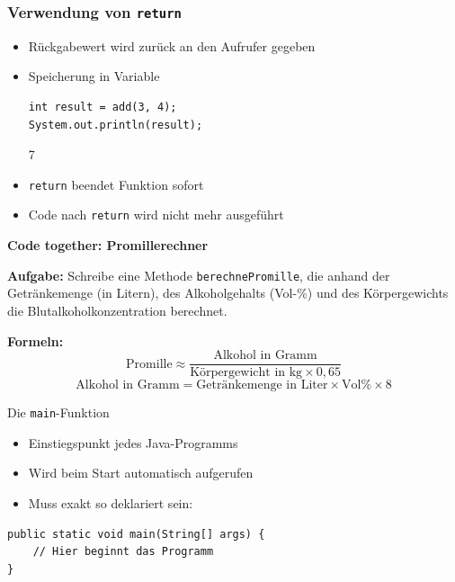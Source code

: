 \documentclass{../../presentation}
\begin{document}
\begin{frame}[fragile]
	\frametitle{Verwendung von \texttt{return}}

	\begin{itemize}
		\item\pause Rückgabewert wird zurück an den Aufrufer gegeben
		\item\pause Speicherung in Variable
		      \begin{verbatim}
int result = add(3, 4);
System.out.println(result); 
		\end{verbatim}
		      \begin{ausgabe}
			      7
		      \end{ausgabe}
		\item\pause \texttt{return} beendet Funktion sofort
		\item\pause Code nach \texttt{return} wird nicht mehr ausgeführt
	\end{itemize}
\end{frame}


\begin{frame}[plain]
    \centering
    {\Huge\bfseries Code together: Promillerechner}

    \vspace{1em}

    \begin{flushleft}
        \textbf{Aufgabe:} Schreibe eine Methode \texttt{berechnePromille}, die anhand der Getränkemenge (in Litern), 
        des Alkoholgehalts (Vol-\%) und des Körpergewichts die Blutalkoholkonzentration berechnet. 

        \vspace{1em}

        \textbf{Formeln:} 
        \[
            \text{Promille} \approx \frac{\text{Alkohol in Gramm}}{\text{Körpergewicht in kg} \times 0{,}65}
        \]
        \[
            \text{Alkohol in Gramm} = \text{Getränkemenge in Liter} \times \text{Vol\%} \times 8
        \]
    \end{flushleft}
\end{frame}




\begin{frame}[fragile]{Die \texttt{main}-Funktion}
	\begin{itemize}
		\item\pause Einstiegspunkt jedes Java-Programms
		\item\pause Wird beim Start automatisch aufgerufen
		\item\pause Muss exakt so deklariert sein:
	\end{itemize}

	\vspace{0.5em}

	\begin{verbatim}
public static void main(String[] args) {
    // Hier beginnt das Programm
}
\end{verbatim}
\end{frame}
\end{document}
